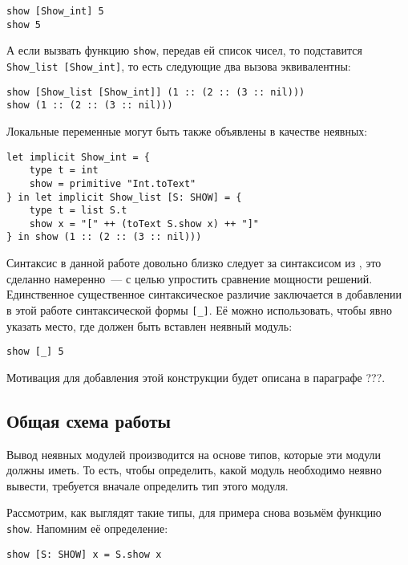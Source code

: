 \documentclass[../diploma.tex]{subfiles}
\begin{document}
\begin{verbatim}
show [Show_int] 5
show 5
\end{verbatim}

А если вызвать функцию \texttt{show}, передав ей список чисел, то подставится \\ \texttt{Show\_list [Show\_int]}, то есть следующие два вызова эквивалентны:

\begin{verbatim}
show [Show_list [Show_int]] (1 :: (2 :: (3 :: nil)))
show (1 :: (2 :: (3 :: nil)))
\end{verbatim}

Локальные переменные могут быть также объявлены в качестве неявных:

\begin{verbatim}
let implicit Show_int = {
    type t = int
    show = primitive "Int.toText"
} in let implicit Show_list [S: SHOW] = {
    type t = list S.t
    show x = "[" ++ (toText S.show x) ++ "]"
} in show (1 :: (2 :: (3 :: nil)))
\end{verbatim}

Синтаксис в данной работе довольно близко следует за синтаксисом из \cite{white}, это сделанно намеренно~--- с целью упростить сравнение мощности решений. Единственное существенное синтаксическое различие заключается в добавлении в этой работе синтаксической формы \texttt{[\_]}. Её можно использовать, чтобы явно указать место, где должен быть вставлен неявный модуль:

\begin{verbatim}
show [_] 5
\end{verbatim}

Мотивация для добавления этой конструкции будет описана в параграфе ???.

\subsection{Общая схема работы}

Вывод неявных модулей производится на основе типов, которые эти модули должны иметь. То есть, чтобы определить, какой модуль необходимо неявно вывести, требуется вначале определить тип этого модуля. 

Рассмотрим, как выглядят такие типы, для примера снова возьмём функцию \texttt{show}. Напомним её определение:

\begin{verbatim}
show [S: SHOW] x = S.show x
\end{verbatim}
\end{document}
